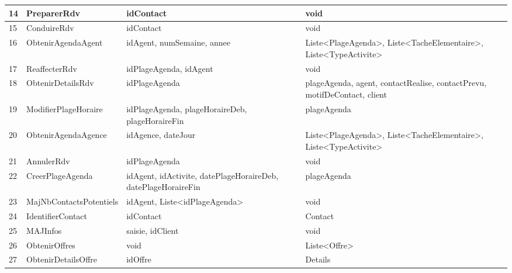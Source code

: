 \begin{table}
{\begin{tabular}{p{1cm}|p{5cm}p{6cm}p{6cm}}
            14 & PreparerRdv                        & idContact                                                     & void\\ \hline
            15 & ConduireRdv                        & idContact                                                     & void\\ \hline
            16 & ObtenirAgendaAgent                 & idAgent, numSemaine, annee                                    & Liste<PlageAgenda>, Liste<TacheElementaire>, Liste<TypeActivite> \\ \hline
            17 & ReaffecterRdv                      & idPlageAgenda, idAgent                                        & void\\ \hline
            18 & ObtenirDetailsRdv                  & idPlageAgenda                                                 & plageAgenda, agent, contactRealise,  contactPrevu, motifDeContact, client\\ \hline
            19 & ModifierPlageHoraire               & idPlageAgenda, plageHoraireDeb, plageHoraireFin               & plageAgenda\\ \hline
            20 & ObtenirAgendaAgence                & idAgence, dateJour                                            & Liste<PlageAgenda>, Liste<TacheElementaire>,  Liste<TypeActivite>\\ \hline
            21 & AnnulerRdv                         & idPlageAgenda                                                 & void\\ \hline
            22 & CreerPlageAgenda                   & idAgent, idActivite, datePlageHoraireDeb, datePlageHoraireFin & plageAgenda\\ \hline
            23 & MajNbContactsPotentiels            & idAgent, Liste<idPlageAgenda>                                 & void\\ \hline
            24 & IdentifierContact                  & idContact                                                     & Contact\\ \hline
            25 & MAJInfos                           & saisie, idClient                                              & void\\ \hline
            26 & ObtenirOffres                      & void                                                          & Liste<Offre>\\ \hline
            27 & ObtenirDetailsOffre                & idOffre                                                       & Details\\ \hline

\end{tabular}}
\end{table}
